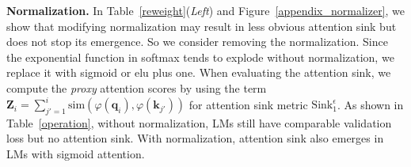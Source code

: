\documentclass{article} \usepackage{iclr2025_conference,times}
\begin{document}
\textbf{Normalization.} In Table~\ref{reweight}(\emph{Left}) and Figure~\ref{appendix_normalizer}, we show that modifying normalization may result in less obvious attention sink but does not stop its emergence. So we consider removing the normalization. Since the exponential function in softmax tends to explode without normalization, we replace it with sigmoid or elu plus one. When evaluating the attention sink, we compute the \textit{proxy} attention scores by using the term $\boldsymbol{Z}_i=\sum_{j'=1}^i\textrm{sim}(\varphi(\boldsymbol{q}_i)\textrm{,}\,\varphi(\boldsymbol{k}_{j'}))$ for attention sink metric $\textrm{Sink}_1^{\epsilon}$. As shown in Table~\ref{operation}, without normalization, LMs still have comparable validation loss but no attention sink. With normalization, attention sink also emerges in LMs with sigmoid attention.
\end{document}
